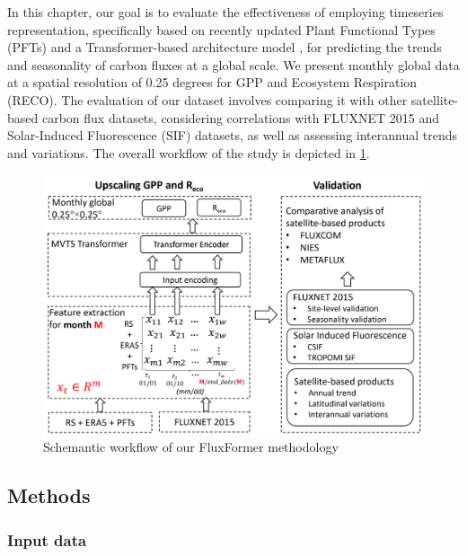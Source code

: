 In this chapter, our goal is to evaluate the effectiveness of employing timeseries representation, specifically based on recently updated Plant Functional Types (PFTs) \citep{harper202229} and a Transformer-based architecture model \citep{zerveas2021transformer}, for predicting the trends and seasonality of carbon fluxes at a global scale. We present monthly global data at a spatial resolution of 0.25 degrees for GPP and Ecosystem Respiration (RECO). The evaluation of our dataset involves comparing it with other satellite-based carbon flux datasets, considering correlations with FLUXNET 2015 and Solar-Induced Fluorescence (SIF) datasets, as well as assessing interannual trends and variations. The overall workflow of the study is depicted in \ref{fig:chap6_fig1}.

\begin{figure}[tbh!]
    \centering
    \includegraphics[width=\textwidth]{figs/chap6/workflow.png}
    \caption[Schemantic workflow of our FluxFormer methodology]{Schemantic workflow of our FluxFormer methodology}
    \label{fig:chap6_fig1}
\end{figure}

\subsection{Methods}
\subsubsection{Input data}

